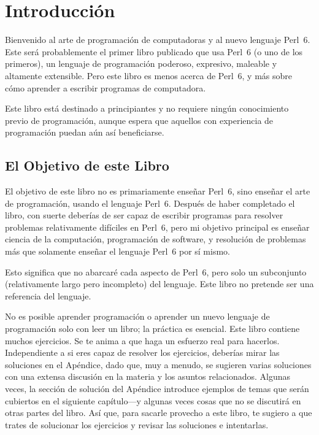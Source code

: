 
\chapter{Introducción}

Bienvenido al arte de programación de computadoras y 
al nuevo lenguaje Perl~6. Este será probablemente el primer
libro publicado que usa Perl~6 (o uno de los primeros), 
un lenguaje de programación poderoso, expresivo, maleable
y altamente extensible. Pero este libro es menos acerca de
Perl~6, y más sobre cómo aprender a escribir programas 
de computadora. 

Este libro está destinado a principiantes y no requiere ningún conocimiento
previo de programación, aunque espera que aquellos con experiencia de 
programación puedan aún así beneficiarse.

\section*{El Objetivo de este Libro}

El objetivo de este libro no es primariamente enseñar Perl~6,
sino enseñar el arte de programación, usando el lenguaje Perl~6. 
Después de haber completado el libro, con suerte deberías de ser capaz
de escribir programas para resolver problemas relativamente difíciles en 
Perl~6, pero mi objetivo principal es enseñar ciencia de la computación,
programación de software, y resolución de problemas más que solamente
enseñar el lenguaje Perl~6 por sí mismo.

Esto significa que no abarcaré cada aspecto de Perl~6, pero
solo un subconjunto (relativamente largo pero incompleto) del
lenguaje. Este libro no pretende ser una referencia del lenguaje.

No es posible aprender programación o aprender un nuevo
lenguaje de programación solo con leer un libro;
la práctica es esencial. Este libro contiene
muchos ejercicios. Se te anima a que haga un esfuerzo real
para hacerlos. Independiente a si eres capaz de resolver los 
ejercicios, deberías mirar las soluciones en el Apéndice, dado
que, muy a menudo, se sugieren varias soluciones con una extensa
discusión en la materia y los asuntos relacionados. Algunas
veces, la sección de solución del Apéndice introduce ejemplos
de temas que serán cubiertos en el siguiente capítulo---y algunas 
veces cosas que no se discutirá en otras partes del libro. Así que,
para sacarle provecho a este libro, te sugiero a que trates de solucionar
los ejercicios y revisar las soluciones e intentarlas.

